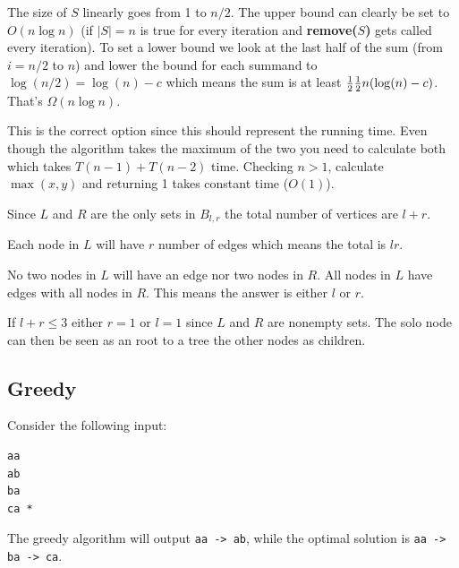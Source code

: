 \documentclass[a4paper]{article}
\newenvironment{task}[1]
{
	\begin{description}[align=right]
		\item [#1]
}{		%
	\end{description}
}
\newcommand{\abs}[1]{\left|#1\right|}
\let\*\relax
\DeclareMathOperator{\*}{\cdot}
\begin{document}
\begin{task}{(b)}
	 The size of $S$ linearly goes from 1 to $n/2$. The upper bound can clearly be set to $O(n\log n)$ (if  $\abs{S}=n$ is true for every iteration and \textbf{remove($S$)} gets called every iteration). To set a lower bound we look at the last half of the sum (from $i=n/2$ to $n$) and lower the bound for each summand to $\log (n/2)=\log (n)-c$ which means the sum is at least $\frac{1}{2}\*\frac{1}{2}\*n\*(\log(n)-c)$. That’s $\Omega(n\log n)$.
\end{task}

\begin{task}{4. (a)}
	 This is the correct option since this should represent the running time. Even though the algorithm takes the maximum of the two you need to calculate both which takes $T(n-1)+T(n-2)$ time. Checking $n > 1$, calculate $\max(x,y)$ and returning 1 takes constant time ($O(1)$).
\end{task}

\begin{task}{5. (a)}
	 Since $L$ and $R$ are the only sets in $B_{l,r}$ the total number of vertices are $l+r$.
\end{task}

\begin{task}{(b)}
	 Each node in $L$ will have $r$ number of edges which means the total is $lr$.
\end{task}

\begin{task}{(c)}
	 No two nodes in $L$ will have an edge nor two nodes in $R$. All nodes in $L$ have edges with all nodes in $R$. This means the answer is either $l$ or $r$.
\end{task}

\begin{task}{(d)}
	 If $l+r\leq 3$ either $r=1$ or $l=1$ since $L$ and $R$ are nonempty sets. The solo node can then be seen as an root to a tree the other nodes as children.
\end{task}

\subsection*{Greedy}

\begin{task}{6. (a)}
	\qquad Consider the following input:
\begin{lstlisting}
aa
ab
ba
ca *
\end{lstlisting}
	The greedy algorithm will output \texttt{aa -> ab}, while the optimal solution is \texttt{aa -> ba -> ca}.
\end{task}
\end{document}
